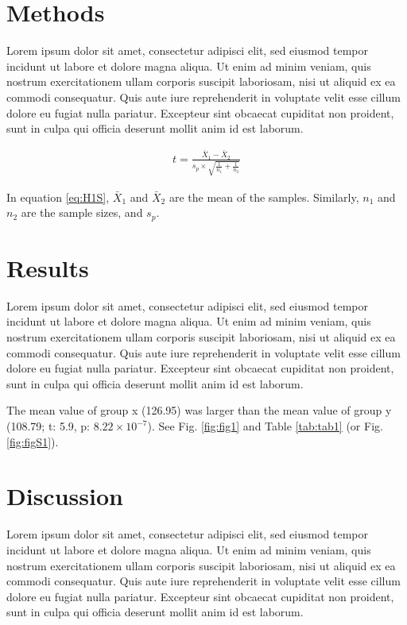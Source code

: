 \documentclass[
  12pt,
]{article}
\begin{document}
\hypertarget{methods}{%
\section{Methods}\label{methods}}

Lorem ipsum dolor sit amet, consectetur adipisci elit, sed eiusmod tempor incidunt ut labore et dolore magna aliqua. Ut enim ad minim veniam, quis nostrum exercitationem ullam corporis suscipit laboriosam, nisi ut aliquid ex ea commodi consequatur. Quis aute iure reprehenderit in voluptate velit esse cillum dolore eu fugiat nulla pariatur. Excepteur sint obcaecat cupiditat non proident, sunt in culpa qui officia deserunt mollit anim id est laborum.

\begin{align}
t = \frac{\bar{X}_{1} - \bar{X}_{2}} {s_{p} \times \sqrt{\frac{1}{n_{1}} + \frac{1}{n_{2}}}} \label{eq:H1S}
\end{align}

In equation \eqref{eq:H1S}, \(\bar{X}_{1}\) and \(\bar{X}_{2}\) are the mean of the samples. Similarly, \(n_{1}\) and \(n_{2}\) are the sample sizes, and \(s_{p}\).

\hypertarget{results}{%
\section{Results}\label{results}}

Lorem ipsum dolor sit amet, consectetur adipisci elit, sed eiusmod tempor incidunt ut labore et dolore magna aliqua. Ut enim ad minim veniam, quis nostrum exercitationem ullam corporis suscipit laboriosam, nisi ut aliquid ex ea commodi consequatur. Quis aute iure reprehenderit in voluptate velit esse cillum dolore eu fugiat nulla pariatur. Excepteur sint obcaecat cupiditat non proident, sunt in culpa qui officia deserunt mollit anim id est laborum.

The mean value of group x (126.95) was larger than the mean value of group y (108.79; t: 5.9, p: \ensuremath{8.22\times 10^{-7}}). See Fig. \ref{fig:fig1} and Table \ref{tab:tab1} (or Fig. \ref{fig:figS1}).

\hypertarget{discussion}{%
\section{Discussion}\label{discussion}}

Lorem ipsum dolor sit amet, consectetur adipisci elit, sed eiusmod tempor incidunt ut labore et dolore magna aliqua. Ut enim ad minim veniam, quis nostrum exercitationem ullam corporis suscipit laboriosam, nisi ut aliquid ex ea commodi consequatur. Quis aute iure reprehenderit in voluptate velit esse cillum dolore eu fugiat nulla pariatur. Excepteur sint obcaecat cupiditat non proident, sunt in culpa qui officia deserunt mollit anim id est laborum.
\end{document}
